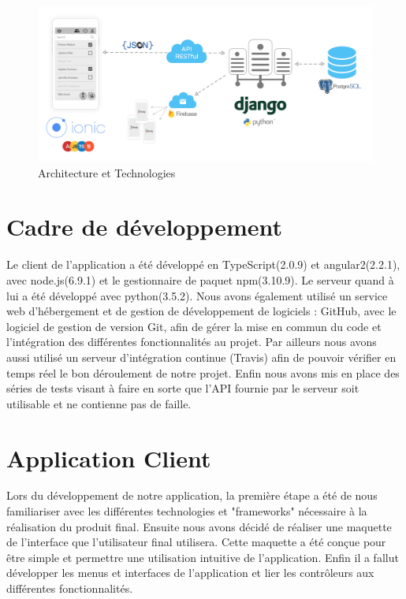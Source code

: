 \documentclass[french]{article}
\begin{document}
		\begin{figure}[H]
			\centering
			\includegraphics[scale=0.35]{../schema/schema-techno.png}
			\caption{Architecture et Technologies}
			\label{Architecture et Technologies}
		\end{figure}
		
	
	\section{Cadre de développement} 
		Le client de l'application a été développé en TypeScript(2.0.9) et angular2(2.2.1), avec node.js(6.9.1) et le gestionnaire de paquet npm(3.10.9). Le serveur quand à lui a été développé avec python(3.5.2). 
		Nous avons également utilisé un service web d'hébergement et de gestion de développement de logiciels : GitHub, avec le logiciel de gestion de version Git, afin de gérer la mise en commun du code et l'intégration des différentes fonctionnalités au projet.
		Par ailleurs nous avons aussi utilisé un serveur d'intégration continue (Travis) afin de pouvoir vérifier en temps réel le bon déroulement de notre projet.
		Enfin nous avons mis en place des séries de tests visant à faire en sorte que l'API fournie par le serveur soit utilisable et ne contienne pas de faille.
			
	\section{Application Client}
	
	Lors du développement de notre application, la première étape a été de nous familiariser avec les différentes technologies et "frameworks" nécessaire à la réalisation du produit final. Ensuite nous avons décidé de réaliser une maquette de l'interface que l'utilisateur final utilisera. Cette maquette a été conçue pour être simple et permettre une utilisation intuitive de l'application. Enfin il a fallut développer les menus et interfaces de l'application et lier les contrôleurs aux différentes fonctionnalités.
	
\end{document}
